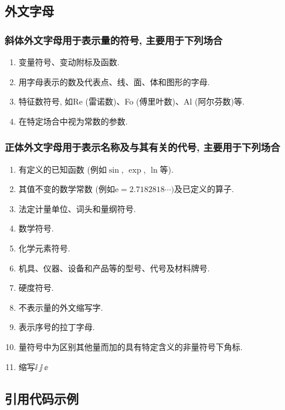 \documentclass{urtemp}
\begin{document}
\subsection{外文字母}
\subsubsection{斜体外文字母用于表示量的符号, 主要用于下列场合}

\begin{enumerate}
\renewcommand{\labelenumi}{(\theenumi)}
\item 变量符号、变动附标及函数. 
\item 用字母表示的数及代表点、线、面、体和图形的字母. 
\item 特征数符号, 如Re (雷诺数)、Fo (傅里叶数)、Al (阿尔芬数)等. 
\item 在特定场合中视为常数的参数. 
\end{enumerate} 

\subsubsection{正体外文字母用于表示名称及与其有关的代号, 主要用于下列场合}
\begin{enumerate}
\renewcommand{\labelenumi}{(\theenumi)}
\item 有定义的已知函数 (例如$\sin$, $\exp$, $\ln$等). 
\item 其值不变的数学常数 (例如$\mathrm{e} = 2.718 281 8\cdots)$及已定义的算子. 
\item 法定计量单位、词头和量纲符号. 
\item 数学符号. 
\item 化学元素符号. 
\item 机具、仪器、设备和产品等的型号、代号及材料牌号. 
\item 硬度符号. 
\item 不表示量的外文缩写字. 
\item 表示序号的拉丁字母. 
\item 量符号中为区别其他量而加的具有特定含义的非量符号下角标.
\item 缩写$\ii\ \jj\ \ee$ 
\end{enumerate} 

\subsection{引用代码示例}


\end{document}
